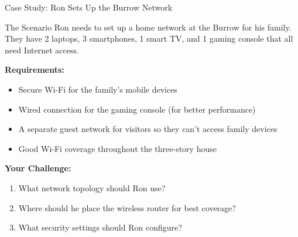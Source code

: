 \documentclass[aspectratio=169]{beamer}
\begin{document}
\begin{frame}{Case Study: Ron Sets Up the Burrow Network}

\begin{alertblock}{The Scenario}
Ron needs to set up a home network at the Burrow for his family. They have 2 laptops, 3 smartphones, 1 smart TV, and 1 gaming console that all need Internet access.
\end{alertblock}

\vspace{0.3cm}

\textbf{Requirements:}
\begin{itemize}
    \item Secure Wi-Fi for the family's mobile devices
    \item Wired connection for the gaming console (for better performance)
    \item A separate guest network for visitors so they can't access family devices
    \item Good Wi-Fi coverage throughout the three-story house
\end{itemize}

\vspace{0.3cm}

\textbf{Your Challenge:}
\begin{enumerate}
    \item What network topology should Ron use?
    \item Where should he place the wireless router for best coverage?
    \item What security settings should Ron configure?
\end{enumerate}

\end{frame}
\end{document}
